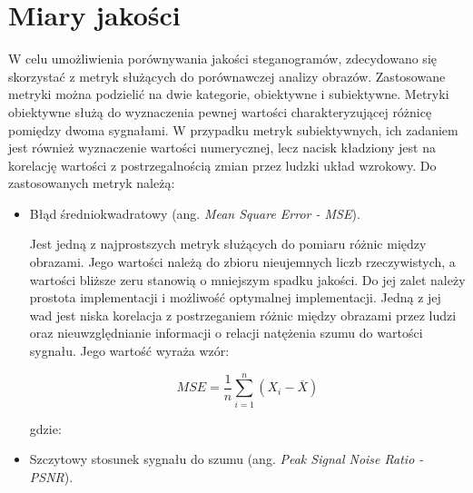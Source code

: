 {    %
    \section{Miary jakości}\label{sec:measures}
    {
        W celu umożliwienia porównywania jakości steganogramów, zdecydowano się skorzystać z metryk służących do
        porównawczej analizy obrazów. Zastosowane metryki można podzielić na dwie kategorie, obiektywne i subiektywne.
        Metryki obiektywne służą do wyznaczenia pewnej wartości charakteryzującej różnicę pomiędzy dwoma sygnałami. W
        przypadku metryk subiektywnych, ich zadaniem jest również wyznaczenie wartości numerycznej, lecz nacisk
        kładziony jest na korelację wartości z postrzegalnością zmian przez ludzki układ wzrokowy. Do zastosowanych
        metryk należą:

        \begin{itemize}
            \item Błąd średniokwadratowy (ang. \textit{Mean Square Error - MSE}).

            Jest jedną z najprostszych metryk służących do pomiaru różnic między obrazami. Jego wartości należą do
            zbioru nieujemnych liczb rzeczywistych, a wartości bliższe zeru stanowią o mniejszym spadku jakości. Do jej
            zalet należy prostota implementacji i możliwość optymalnej implementacji. Jedną z jej wad jest niska
            korelacja z postrzeganiem różnic między obrazami przez ludzi oraz nieuwzględnianie informacji o relacji
            natężenia szumu do wartości sygnału. Jego wartość wyraża wzór:

            \begin{equation}\label{eqt:mse}
                \mathit{MSE} = \frac{1}{n} \sum_{i=1}^n (X_i - \overline{X})
            \end{equation}

            gdzie:

            \item Szczytowy stosunek sygnału do szumu (ang. \textit{Peak Signal Noise Ratio - PSNR}).


\end{itemize}}}
